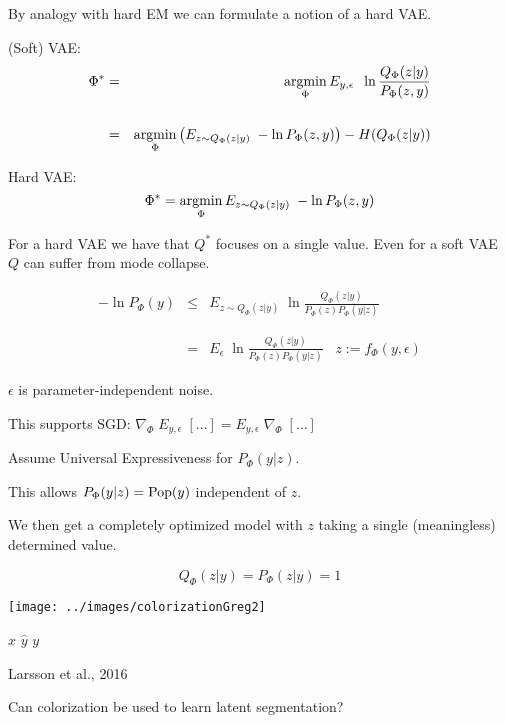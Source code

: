 {\vfill
By analogy with hard EM we can formulate a notion of a hard VAE.


(Soft) VAE:
\begin{eqnarray*}
\Phi^* & = & \operatorname*{argmin}_\Phi E_{y,\epsilon}\;\;\ln \frac{Q_\Phi(z|y)}{P_\Phi(z,y)} \\
\\
& = & \operatorname*{argmin}_\Phi \left(E_{z\sim Q_\Phi(z|y)} \;-\ln P_\Phi(z,y)\right) - H(Q_\Phi(z|y))
\end{eqnarray*}

\vfill
Hard VAE:
$$\Phi^* = \operatorname*{argmin}_\Phi E_{z\sim Q_\Phi(z|y)} \;-\ln P_\Phi(z,y)$$

\vfill
For a hard VAE we have that $Q^*$ focuses on a single value.  Even for a soft VAE $Q$ can suffer from mode collapse.


\begin{eqnarray*}
- \ln P_\Phi(y) & \leq & E_{z \sim Q_\Phi(z|y)}\;\ln \frac{Q_\Phi(z|y)}{P_\Phi(z)P_\Phi(y|z)} \\
\\
\\
& = & E_\epsilon\;\ln \frac{Q_\Phi(z|y)}{P_\Phi(z)P_\Phi(y|z)}\;\;\;z := f_\Phi(y,\epsilon)
\end{eqnarray*}

\vfill
$\epsilon$ is parameter-independent noise.

\vfill
This supports SGD: $\nabla_\Phi \;E_{y,\epsilon}\; [\ldots] = E_{y,\epsilon}\; \nabla_\Phi\;[\ldots]$


Assume Universal Expressiveness for $P_\Phi(y|z)$.

\vfill
This allows $P_\Phi(y|z) = \mathrm{Pop}(y)$ independent of $z$.

\vfill
We then get a completely optimized model with $z$ taking a single (meaningless) determined value.

\vfill
$$Q_\Phi(z|y) = P_\Phi(z|y) = 1$$

\medskip
\centerline{\texttt{[image: ../images/colorizationGreg2]}}
\centerline{$x$ \hspace{4em} $\hat{y}$ \hspace{4em} $y$}
\centerline{\huge Larsson et al., 2016}

\vfill
Can colorization be used to learn latent segmentation?

}
